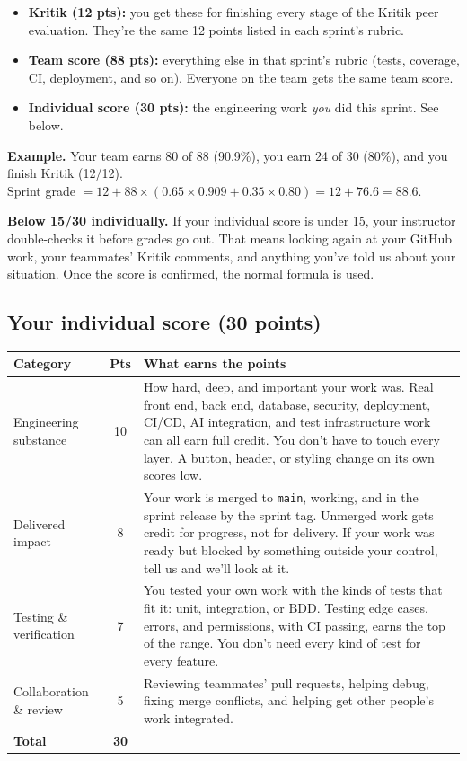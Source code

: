 \documentclass[11pt]{article}
\begin{document}
\begin{itemize}
    \item \textbf{Kritik (12 pts):} you get these for finishing every stage of the Kritik peer evaluation. They're the same 12 points listed in each sprint's rubric.
    \item \textbf{Team score (88 pts):} everything else in that sprint's rubric (tests, coverage, CI, deployment, and so on). Everyone on the team gets the same team score.
    \item \textbf{Individual score (30 pts):} the engineering work \emph{you} did this sprint. See below.
\end{itemize}

\textbf{Example.} Your team earns 80 of 88 (90.9\%), you earn 24 of 30 (80\%), and you finish Kritik (12/12).\\
Sprint grade $= 12 + 88 \times (0.65 \times 0.909 + 0.35 \times 0.80) = 12 + 76.6 = \mathbf{88.6}$.

\textbf{Below 15/30 individually.} If your individual score is under 15, your instructor double-checks it before grades go out. That means looking again at your GitHub work, your teammates' Kritik comments, and anything you've told us about your situation. Once the score is confirmed, the normal formula is used.

\subsection*{Your individual score (30 points)}

\begin{center}
\renewcommand{\arraystretch}{1.3}
\begin{tabular}{>{\raggedright\arraybackslash}p{4.2cm} c >{\raggedright\arraybackslash}p{9.3cm}}
\toprule
\textbf{Category} & \textbf{Pts} & \textbf{What earns the points} \\
\midrule
Engineering substance & 10 & How hard, deep, and important your work was. Real front end, back end, database, security, deployment, CI/CD, AI integration, and test infrastructure work can all earn full credit. You don't have to touch every layer. A button, header, or styling change on its own scores low. \\
Delivered impact & 8 & Your work is merged to \texttt{main}, working, and in the sprint release by the sprint tag. Unmerged work gets credit for progress, not for delivery. If your work was ready but blocked by something outside your control, tell us and we'll look at it. \\
Testing \& verification & 7 & You tested your own work with the kinds of tests that fit it: unit, integration, or BDD. Testing edge cases, errors, and permissions, with CI passing, earns the top of the range. You don't need every kind of test for every feature. \\
Collaboration \& review & 5 & Reviewing teammates' pull requests, helping debug, fixing merge conflicts, and helping get other people's work integrated. \\
\midrule
\textbf{Total} & \textbf{30} & \\
\bottomrule
\end{tabular}
\end{center}
\end{document}
